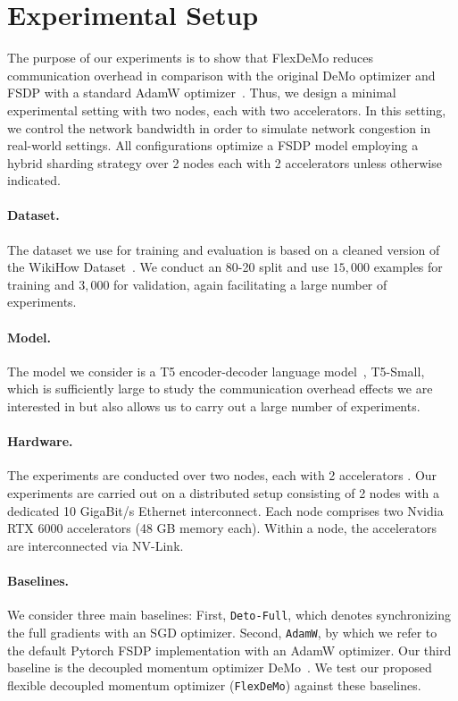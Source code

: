 \section{Experimental Setup}
The purpose of our experiments is to show that FlexDeMo reduces communication overhead in comparison with the original DeMo optimizer and FSDP with a standard AdamW optimizer~\cite{kingma2014adam,adamw}. Thus, we design a minimal experimental setting with two nodes, each with two accelerators. In this setting, we control the network bandwidth in order to simulate network congestion in real-world settings. All configurations optimize a FSDP model employing a hybrid sharding strategy over 2 nodes each with 2 accelerators unless otherwise indicated. 


\paragraph{Dataset.} 
The dataset we use for training and evaluation is based on a cleaned version of the WikiHow Dataset~\cite{koupaee2018wikihow}.
We conduct an 80-20 split and use $15{,}000$ examples for training and $3{,}000$ for validation, again facilitating a large number of experiments. 

\paragraph{Model.} The model we consider is a T5 encoder-decoder language model~\cite{raffel2020exploring}, T5-Small, which is sufficiently large to study the communication overhead effects we are interested in but also allows us to carry out a large number of experiments.



\paragraph{Hardware.}
The experiments are conducted over two nodes, each with 2 accelerators . Our experiments are carried out on a distributed setup consisting of 2 nodes  with a dedicated 10 GigaBit/s Ethernet interconnect. Each node comprises two Nvidia RTX 6000 accelerators (48 GB memory each). Within a node, the accelerators are interconnected via NV-Link.

\paragraph{Baselines.}
We consider three main baselines:
First, \texttt{Deto-Full}, which denotes synchronizing the full gradients with an SGD optimizer. Second, \texttt{AdamW}, by which we refer to the default Pytorch FSDP implementation with an AdamW optimizer. 
Our third baseline is the decoupled momentum optimizer DeMo~\cite{peng2024demodecoupledmomentumoptimization}.
We test our proposed flexible decoupled momentum optimizer (\texttt{FlexDeMo}) against these baselines.

